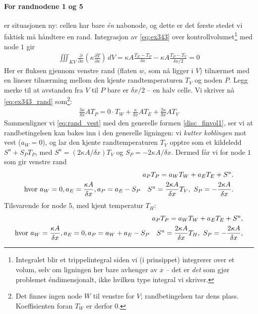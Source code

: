 \paragraph{For randnodene 1 og 5} er situasjonen ny: cellen har bare \emph{én} nabonode, og dette er det første stedet vi faktisk må håndtere en rand. Integrasjon av \eqref{eq:ex343} over kontrollvolumet\footnote{Integralet blir et trippelintegral siden vi (i prinsippet) integrerer over et volum, selv om ligningen her bare avhenger av $x$ -- det er \emph{det} som gjør problemet éndimensjonalt, ikke hvilken type integral vi skriver.} med node $1$ gir
\begin{align}\label{eq:ex343_rand}
\iiint_{KV} \frac{\partial}{\partial x}\left(\kappa\frac{\partial T}{\partial x}\right) \, dV = \kappa A\frac{T_E-T_P}{\delta x} -\kappa A\frac{T_P-T_V}{\delta x/2}=0
\end{align}
Her er fluksen gjennom venstre rand (flaten $w$, som nå ligger i $V$) tilnærmet med en lineær tilnærming mellom den kjente randtemperaturen $T_V$ og noden $P$. Legg merke til at avstanden fra $V$ til $P$ bare er $\delta x/2$ -- en halv celle. Vi skriver nå \eqref{eq:ex343_rand} som\footnote{Det finnes ingen node $W$ til venstre for $V$; randbetingelsen tar dens plass. Koeffisienten foran $T_W$ er derfor $0$.}:
\begin{align}\label{eq:rand_vest}
\frac{3\kappa}{\delta x} A T_P = 0\cdot T_W + \frac{\kappa}{\delta x} A T_E + \frac{2\kappa}{\delta x} A T_V
\end{align}
Sammenligner vi \eqref{eq:rand_vest} med den generelle formen \eqref{disc_finvol1}, ser vi at randbetingelsen kan bakes inn i den generelle ligningen: vi \emph{kutter koblingen} mot vest ($a_W=0$), og lar den kjente randtemperaturen $T_V$ opptre som et kildeledd $S^u+S_PT_P$, med $S^u=(2\kappa A/\delta x)T_V$ og $S_P = -2\kappa A/\delta x$.
Dermed får vi for node $1$ som gir venstre rand
\begin{align}\label{eq:ex343_rand1}
a_P T_P = a_W T_W +a_E  T_E + S^u.\notag \\ \text{hvor } a_W=0, a_E = \frac{\kappa A}{\delta x}, a_P = a_E - S_P  \quad S^u = \frac{2\kappa A}{\delta x} T_V, \ S_P = -\frac{2\kappa A}{\delta x}. 
\end{align}
Tilsvarende for node $5$, med kjent temperatur $T_H$:
\begin{align}\label{eq:ex343_rand5}
a_P T_P = a_W T_W + a_E T_E + S^u, \notag\\ 
\text{hvor } a_W=\frac{\kappa A}{\delta x}, a_E = 0, a_P = a_W +a_E - S_P  \quad S^u = \frac{2\kappa A}{\delta x} T_H, \ S_P = -\frac{2\kappa A}{\delta x},
\end{align}

